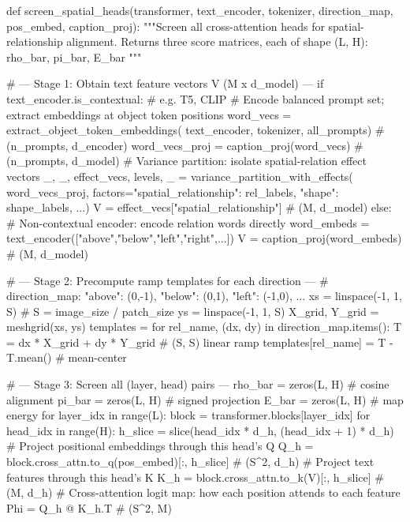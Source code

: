 \vspace{-15pt}
\begin{RoundedListing}[basicstyle=\fontsize{8}{9}\selectfont\ttfamily\color{atomForeground}]
def screen_spatial_heads(transformer, text_encoder, tokenizer,
                         direction_map, pos_embed, caption_proj):
    """Screen all cross-attention heads for spatial-relationship alignment.
    Returns three score matrices, each of shape (L, H): rho_bar, pi_bar, E_bar  """

    # --- Stage 1: Obtain text feature vectors V (M x d_model) ---
    if text_encoder.is_contextual:  # e.g. T5, CLIP
        # Encode balanced prompt set; extract embeddings at object token positions
        word_vecs = extract_object_token_embeddings(
            text_encoder, tokenizer, all_prompts)   # (n_prompts, d_encoder)
        word_vecs_proj = caption_proj(word_vecs)     # (n_prompts, d_model)
        # Variance partition: isolate spatial-relation effect vectors
        _, _, effect_vecs, levels, _ = variance_partition_with_effects(
            word_vecs_proj,
            factors={"spatial_relationship": rel_labels,
                     "shape": shape_labels, ...})
        V = effect_vecs["spatial_relationship"]      # (M, d_model)
    else:
        # Non-contextual encoder: encode relation words directly
        word_embeds = text_encoder(["above","below","left","right",...])
        V = caption_proj(word_embeds)                # (M, d_model)

    # --- Stage 2: Precompute ramp templates for each direction ---
    # direction_map: {"above": (0,-1), "below": (0,1), "left": (-1,0), ...}
    xs = linspace(-1, 1, S)  # S = image_size / patch_size
    ys = linspace(-1, 1, S)
    X_grid, Y_grid = meshgrid(xs, ys)
    templates = {}
    for rel_name, (dx, dy) in direction_map.items():
        T = dx * X_grid + dy * Y_grid   # (S, S) linear ramp
        templates[rel_name] = T - T.mean()  # mean-center

    # --- Stage 3: Screen all (layer, head) pairs ---
    rho_bar = zeros(L, H)   # cosine alignment
    pi_bar  = zeros(L, H)   # signed projection
    E_bar   = zeros(L, H)   # map energy
    for layer_idx in range(L):
        block = transformer.blocks[layer_idx]
        for head_idx in range(H):
            h_slice = slice(head_idx * d_h, (head_idx + 1) * d_h)
            # Project positional embeddings through this head's Q
            Q_h = block.cross_attn.to_q(pos_embed)[:, h_slice]  # (S^2, d_h)
            # Project text features through this head's K
            K_h = block.cross_attn.to_k(V)[:, h_slice]          # (M, d_h)
            # Cross-attention logit map: how each position attends to each feature
            Phi = Q_h @ K_h.T                                   # (S^2, M)


\end{RoundedListing}
